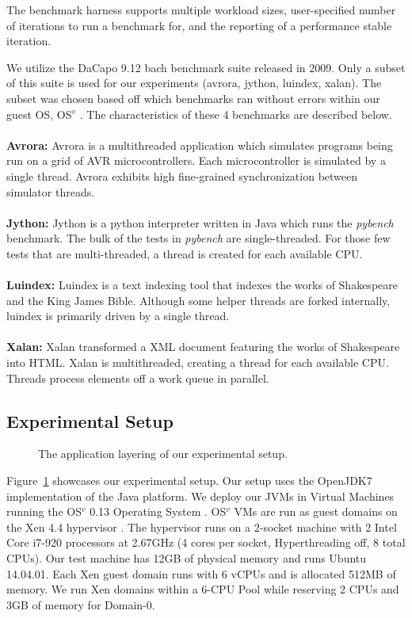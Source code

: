 \documentclass{sig-alternate}
\begin{document}
The benchmark harness supports multiple workload sizes, user-specified number of iterations to run a benchmark for, and the reporting of a performance stable iteration.

We utilize the DaCapo 9.12 bach benchmark suite released in 2009. Only a subset of this suite is used for our experiments (avrora, jython, luindex, xalan). The subset was chosen based off which benchmarks ran without errors within our guest OS, OS$^{v}$ \cite{aviOSv2014}. The characteristics of these 4 benchmarks are described below. 
\\\\
\textbf{Avrora:} Avrora is a multithreaded application which simulates programs being run on a grid of AVR microcontrollers. Each microcontroller is simulated by a single thread. Avrora exhibits high fine-grained synchronization between simulator threads.
\\\\
\textbf{Jython:} Jython is a python interpreter written in Java which runs the \textit{pybench} benchmark. The bulk of the tests in \textit{pybench} are single-threaded. For those few tests that are multi-threaded, a thread is created for each available CPU. 
\\\\
\textbf{Luindex:} Luindex is a text indexing tool that indexes the works of Shakespeare and the King James Bible. Although some helper threads are forked internally, luindex is primarily driven by a single thread.
\\\\
\textbf{Xalan:} Xalan transformed a XML document featuring the works of Shakespeare into HTML. Xalan is multithreaded, creating a thread for each available CPU. Threads process elements off a work queue in parallel.

\subsection{Experimental Setup}\label{subsec:expsetup}
\begin{figure}
\centering
{}
\caption{The application layering of our experimental setup.}
\label{fig:dacaposetup}
\end{figure}

Figure~\ref{fig:dacaposetup} showcases our experimental setup. Our setup uses the OpenJDK7 implementation of the Java platform. We deploy our JVMs in Virtual Machines running the OS$^{v}$ 0.13 Operating System \cite{aviOSv2014}. OS$^{v}$ VMs are run as guest domains on the Xen 4.4 hypervisor \cite{barham2003xen}. The hypervisor runs on a 2-socket machine with 2 Intel Core i7-920 processors at 2.67GHz (4 cores per socket, Hyperthreading off,  8 total CPUs).  Our test machine has 12GB of physical memory and runs Ubuntu 14.04.01. Each Xen guest domain runs with 6 vCPUs and is allocated 512MB of memory. We run Xen domains within a 6-CPU Pool while reserving 2 CPUs and 3GB of memory for Domain-0.  
\end{document}
